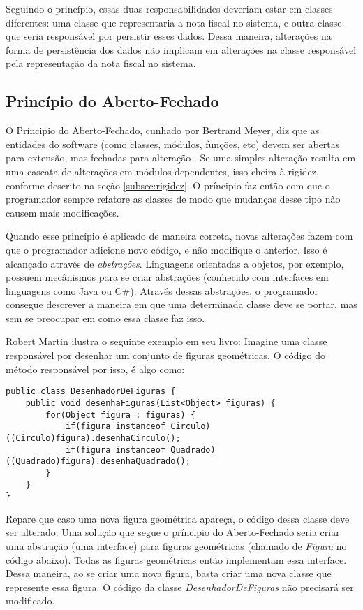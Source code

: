 Seguindo o princípio, essas duas responsabilidades deveriam estar em classes diferentes: uma classe que representaria a nota
fiscal no sistema, e outra classe que seria responsável por persistir esses dados. Dessa maneira, alterações na forma de
persistência dos dados não implicam em alterações na classe responsável pela representação da nota fiscal no sistema.

\subsection{Princípio do Aberto-Fechado}
\label{subsec:ocp}

O Príncipio do Aberto-Fechado, cunhado por Bertrand Meyer, diz que as entidades do software (como classes, módulos, funções, etc)
devem ser abertas para extensão, mas fechadas para alteração \cite{meyer-ocp}. Se uma simples alteração resulta em uma cascata
de alterações em módulos dependentes, isso cheira à rigidez, conforme descrito na seção \ref{subsec:rigidez}. O príncipio faz então
com que o programador sempre refatore as classes de modo que mudanças desse tipo não causem mais modificações.

Quando esse princípio é aplicado de maneira correta, novas alterações fazem com que o programador adicione novo código, e não
modifique o anterior. Isso é alcançado através de \textit{abstrações}. Linguagens orientadas a objetos, por exemplo, possuem
mecânismos para se criar abstrações (conhecido com interfaces em linguagens como Java ou C\#). Através dessas abstrações,
o programador consegue descrever a maneira em que uma determinada classe deve se portar, mas sem se preocupar em como
essa classe faz isso.

Robert Martin \cite{bob-martin} ilustra o seguinte exemplo em seu livro: Imagine uma classe responsável por desenhar 
um conjunto de figuras geométricas. O código do método responsável por isso, é algo como:

\begin{lstlisting}[frame=trbl]
public class DesenhadorDeFiguras {
	public void desenhaFiguras(List<Object> figuras) {
		for(Object figura : figuras) {
			if(figura instanceof Circulo) ((Circulo)figura).desenhaCirculo();
			if(figura instanceof Quadrado) ((Quadrado)figura).desenhaQuadrado();
		}
	}
}
\end{lstlisting}

Repare que caso uma nova figura geométrica apareça, o código dessa classe deve ser alterado. Uma solução que segue
o príncipio do Aberto-Fechado seria criar uma abstração (uma interface) para figuras geométricas (chamado de \textit{Figura} no código abaixo).
Todas as figuras geométricas então implementam essa interface. Dessa maneira, ao se criar uma nova figura, basta criar uma nova classe
que represente essa figura. O código da classe \textit{DesenhadorDeFiguras} não precisará ser modificado.

